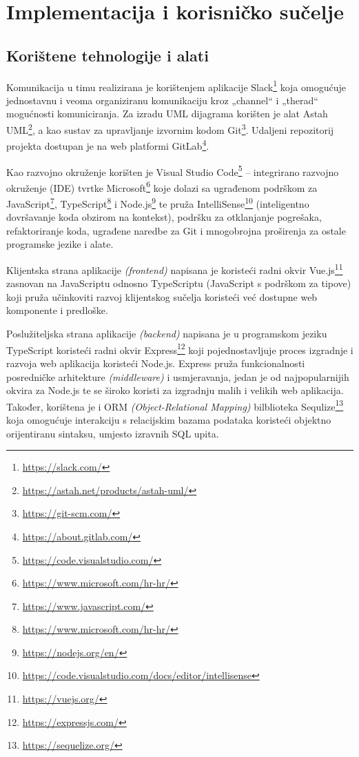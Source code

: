 \chapter{Implementacija i korisničko sučelje}
		
		
		\section{Korištene tehnologije i alati}
		
		\noindent Komunikacija u timu realizirana je korištenjem aplikacije Slack\footnote{\url{https://slack.com/}} koja omogućuje jednostavnu i veoma organiziranu komunikaciju kroz „channel“ i „therad“ mogućnosti komuniciranja. Za izradu UML dijagrama korišten je alat Astah UML\footnote{\url{https://astah.net/products/astah-uml/}}, a kao sustav za upravljanje izvornim kodom Git\footnote{\url{https://git-scm.com/}}. Udaljeni repozitorij projekta dostupan je na web platformi GitLab\footnote{\url{https://about.gitlab.com/}}.

\noindent Kao razvojno okruženje korišten je Visual Studio Code\footnote{\url{https://code.visualstudio.com/}} – integrirano razvojno okruženje (IDE) tvrtke Microsoft\footnote{\url{https://www.microsoft.com/hr-hr/}} koje dolazi sa ugrađenom podrškom za JavaScript\footnote{\url{https://www.javascript.com/}}, TypeScript\footnote{\url{https://www.microsoft.com/hr-hr/}} i Node.js\footnote{\url{https://nodejs.org/en/}} te pruža IntelliSense\footnote{\url{https://code.visualstudio.com/docs/editor/intellisense}} (inteligentno dovršavanje koda obzirom na kontekst), podršku za otklanjanje pogrešaka, refaktoriranje koda, ugrađene naredbe za Git i mnogobrojna proširenja za ostale programske jezike i alate.

\noindent Klijentska strana aplikacije \textit{(frontend)} napisana je koristeći radni okvir Vue.js\footnote{\url{https://vuejs.org/}} zasnovan na JavaScriptu odnosno TypeScriptu (JavaScript s podrškom za tipove) koji pruža učinkoviti razvoj klijentskog sučelja koristeći već dostupne web komponente i predloške.

\noindent Poslužiteljska strana aplikacije \textit{(backend)} napisana je u programskom jeziku TypeScript koristeći radni okvir Express\footnote{\url{https://expressjs.com/}} koji pojednostavljuje proces izgradnje i razvoja web aplikacija koristeći Node.js. Express pruža funkcionalnosti posredničke arhitekture \textit{(middleware)} i usmjeravanja, jedan je od najpopularnijih okvira za Node.js te se široko koristi za izgradnju malih i velikih web aplikacija. Također, korištena je i ORM \textit{(Object-Relational Mapping)} bilblioteka Sequlize\footnote{\url{https://sequelize.org/}} koja omogućuje interakciju s relacijskim bazama podataka koristeći objektno orijentiranu sintaksu, umjesto izravnih SQL upita.

